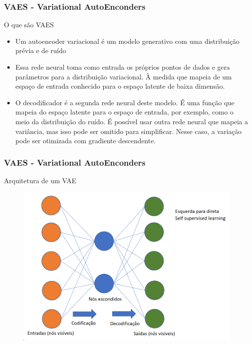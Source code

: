 \documentclass{beamer}
\begin{document}
\begin{frame}
	\frametitle{VAES - Variational AutoEnconders}
	\begin{block}{O que são VAES}
		\begin{itemize}
			\item Um autoencoder variacional é um modelo generativo com uma distribuição prévia e de ruído
			\item Essa rede neural toma como entrada os próprios pontos de dados e gera parâmetros para a distribuição variacional. À medida que mapeia de um espaço de entrada conhecido para o espaço latente de baixa dimensão.
			\item O decodificador é a segunda rede neural deste modelo. É uma função que mapeia do espaço latente para o espaço de entrada, por exemplo, como o meio da distribuição do ruído. É possível usar outra rede neural que mapeia a variância, mas isso pode ser omitido para simplificar. Nesse caso, a variação pode ser otimizada com gradiente descendente.
		\end{itemize}
	\href{https://en.wikipedia.org/wiki/Variational_autoencoder}{}

		
		\end{block}
\end{frame}
\begin{frame}
	\frametitle{VAES - Variational AutoEnconders}
	\begin{block}{Arquitetura de um VAE}
		\begin{figure}
			\centering
			\includegraphics[width=0.7\linewidth]{figures/vaes_archi}
		\end{figure}
	\end{block}
\end{frame}
\end{document}
